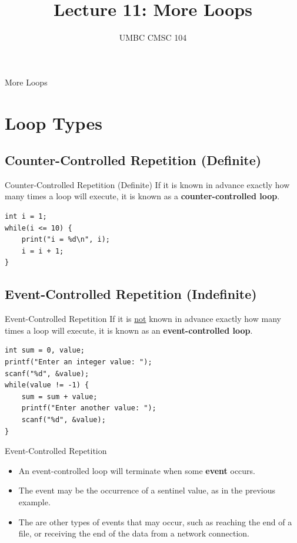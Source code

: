\documentclass[graphics]{beamer}
\title{Lecture 11: More Loops}
\author{UMBC CMSC 104}
\date{}
\begin{document}
\begin{frame}{}
\centering
    More Loops
\end{frame}

\frame{\tableofcontents}

\section{Loop Types}
\subsection{Counter-Controlled Repetition (Definite)}
\begin{frame}[fragile]{Counter-Controlled Repetition (Definite)}
    If it is known in advance exactly how many times a loop will execute, it is known as a \textbf{counter-controlled loop}.
    \begin{verbatim}
int i = 1;
while(i <= 10) {
    print("i = %d\n", i);
    i = i + 1;
}
    \end{verbatim}
\end{frame}

\subsection{Event-Controlled Repetition (Indefinite)}
\begin{frame}[fragile]{Event-Controlled Repetition}
    If it is \underline{not} known in advance exactly how many times a loop will execute, it is known as an \textbf{event-controlled loop}.
    \begin{verbatim}
int sum = 0, value;
printf("Enter an integer value: ");
scanf("%d", &value);
while(value != -1) {
    sum = sum + value;
    printf("Enter another value: ");
    scanf("%d", &value);
}
    \end{verbatim}
\end{frame}

\begin{frame}{Event-Controlled Repetition}
    \begin{itemize}
        \item An event-controlled loop will terminate when some \textbf{event} occurs.
        \item The event may be the occurrence of a sentinel value, as in the previous example.
        \item The are other types of events that may occur, such as reaching the end of a file, or receiving the end of the data from a network connection.
    \end{itemize}
\end{frame}
\end{document}
